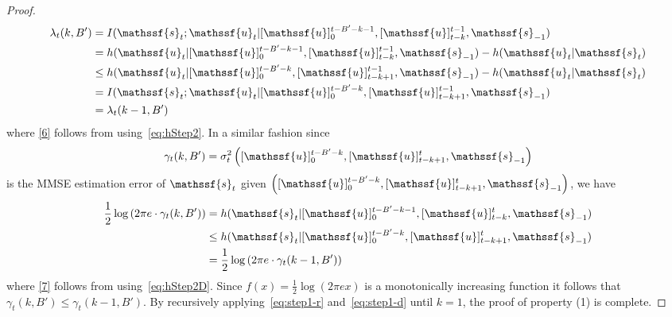 \documentclass[journal, twocolumn, 10pt]{IEEEtran}
\newcommand{\rvs}{{\mathssf{s}}}    %
\newcommand{\rvu}{{\mathssf{u}}}    %
\begin{document}
\begin{proof}
\begin{align}
\lambda_t(k,B') &= I(\rvs_{t}; \rvu_{t} | [\rvu]_{0}^{t-B'-k-1}, [\rvu]_{t-k}^{t-1}, \rvs_{-1}) \notag\\
& = h( \rvu_{t} | [\rvu]_{0}^{t-B'-k-1}, [\rvu]_{t-k}^{t-1}, \rvs_{-1}) - h(\rvu_{t} | \rvs_{t})\notag\\
& \le h( \rvu_{t} | [\rvu]_{0}^{t-B'-k}, [\rvu]_{t-k+1}^{t-1}, \rvs_{-1}) - h(\rvu_{t} | \rvs_{t}) \label{6}\\
& = I(\rvs_{t}; \rvu_{t} | [\rvu]_{0}^{t-B'-k}, [\rvu]_{t-k+1}^{t-1}, \rvs_{-1}) \notag\\
& = \lambda_t(k-1,B')\label{eq:step1-r}
\end{align} where 
\eqref{6} follows from using~\eqref{eq:hStep2}. In a similar fashion since $$\gamma_t(k,B') = \sigma^2_t\left([\rvu]_{0}^{t-B'-k}, [\rvu]_{t-k+1}^{t}, \rvs_{-1}\right)$$ is the MMSE estimation error of $\rvs_t$ given $\left( [\rvu]_{0}^{t-B'-k}, [\rvu]_{t-k+1}^{t}, \rvs_{-1}\right)$, we have
\begin{align}
\frac{1}{2}\log\left(2\pi e \cdot\gamma_t(k,B')\right) &= h(\rvs_{t}| [\rvu]_{0}^{t-B'-k-1}, [\rvu]_{t-k}^{t}, \rvs_{-1}) \notag\\
& \le h( \rvs_{t} | [\rvu]_{0}^{t-B'-k}, [\rvu]_{t-k+1}^{t}, \rvs_{-1}) \label{7}\\
& =\frac{1}{2}\log\left(2\pi e \cdot\gamma_t(k-1,B')\right)\label{eq:step1-d}
\end{align} where \eqref{7} follows from using~\eqref{eq:hStep2D}. 
Since $f(x) = \frac{1}{2}\log(2\pi e x)$ is a monotonically increasing function it follows that ${\gamma_t(k,B') \le \gamma_t(k-1,B')}$. By recursively applying~\eqref{eq:step1-r} and~\eqref{eq:step1-d} until $k=1$, the proof of property (1) is complete.


\end{proof}
\end{document}
